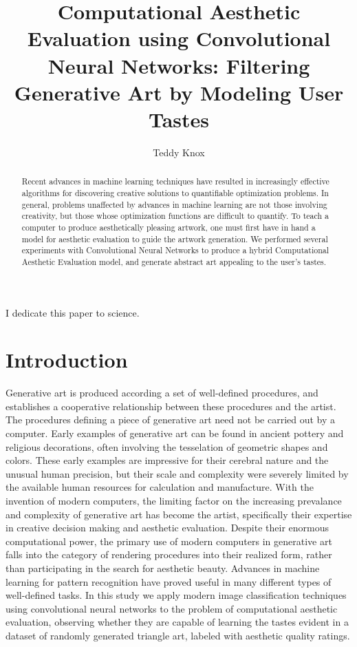 \documentclass[midd]{thesis}
\title {Computational Aesthetic Evaluation using Convolutional Neural Networks: Filtering Generative Art by Modeling User Tastes}
\author {Teddy Knox}
\begin{document}
\maketitle

\begin{abstract}
Recent advances in machine learning techniques have resulted in increasingly effective algorithms for discovering creative
solutions to quantifiable optimization problems. In general, problems unaffected by advances in machine learning are not
those involving creativity, but those whose optimization functions are difficult to quantify. To teach a computer to
produce aesthetically pleasing artwork, one must first have in hand a model for aesthetic evaluation to guide the artwork generation. We performed several experiments with Convolutional Neural Networks to produce a hybrid Computational Aesthetic Evaluation model, and generate abstract art appealing to the user's tastes.
\end{abstract}

\begin{acknowledgements}
I dedicate this paper to science.
\end{acknowledgements}

\contentspage
\tablelistpage
\figurelistpage

\normalspacing \setcounter{page}{1} 

\chapter{Introduction}
\label{sec:intro}

Generative art is produced according a set of well-defined procedures, and establishes a cooperative relationship between these procedures and the artist. The procedures defining a piece of generative art need not be carried out by a computer. Early examples of generative art can be found in ancient pottery and religious decorations, often involving the tesselation of geometric shapes and colors. These early examples are impressive for their cerebral nature and the unusual human precision, but their scale and complexity were severely limited by the available human resources for  calculation and manufacture. With the invention of modern computers, the limiting factor on the increasing prevalance and complexity of generative art has become the artist, specifically their expertise in creative decision making and aesthetic evaluation. Despite their enormous computational power, the primary use of modern computers in generative art falls into the category of rendering procedures into their realized form, rather than participating in the search for aesthetic beauty. Advances in machine learning for pattern recognition have proved useful in many different types of well-defined tasks. In this study we apply modern image classification techniques using convolutional neural networks to the problem of computational aesthetic evaluation, observing whether they are capable of learning the tastes evident in a dataset of randomly generated triangle art, labeled with aesthetic quality ratings.
\end{document}
